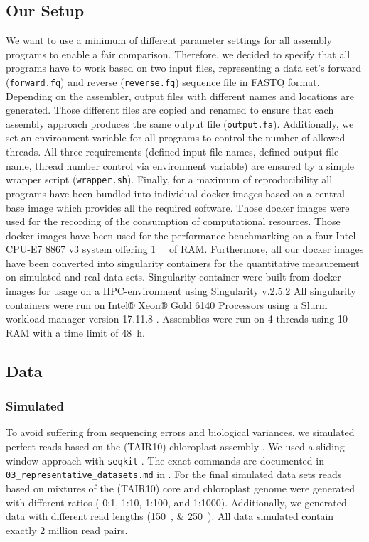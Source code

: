\documentclass{bmcart}
\newcommand{\zenododataset}{\cite{zenododataset}}
\begin{document}
\subsection*{Our Setup}
We want to use a minimum of different parameter settings for all assembly programs to enable a fair comparison. 
Therefore, we decided to specify that all programs have to work based on two input files, representing a data set's forward (\texttt{forward.fq}) and reverse  (\texttt{reverse.fq}) sequence file in FASTQ format.
Depending on the assembler, output files with different names and locations are generated.
Those different files are copied and renamed to ensure that each assembly approach produces the same output file (\texttt{output.fa}). 
Additionally, we set an environment variable for all programs to control the number of allowed threads.
All three requirements (defined input file names, defined output file name, thread number control via environment variable) are ensured by a simple wrapper script (\texttt{wrapper.sh}).
Finally, for a maximum of reproducibility all programs have been bundled into individual docker images based on a central base image which provides all the required software. Those docker images were used for the recording of the consumption of computational resources.
Those docker images have been used for the performance benchmarking on a four Intel CPU-E7 8867 v3 system offering \SI{1}{\tera\byte} of RAM.
Furthermore, all our docker images have been converted into singularity containers for the quantitative measurement on simulated and real data sets.
Singularity container were built from docker images for usage on a HPC-environment using Singularity v.2.5.2 \cite{kurtzer2017singularity}
All singularity containers were run on %
Intel® Xeon® Gold \num{6140} Processors using a Slurm workload manager version 17.11.8 \cite{Jette02slurm}. Assemblies were run on \num{4} threads using \SI{10}{\gibi\byte} RAM with a time limit of \SI{48}{\hour}.
\subsection*{Data}
\subsubsection*{Simulated}
To avoid suffering from sequencing errors and biological variances, we simulated perfect reads based on the  (TAIR10) chloroplast assembly \cite{tair10}.
We used a sliding window approach with \texttt{seqkit} \cite{seqkit}. The exact commands are documented in \href{https://github.com/chloroExtractorTeam/benchmark/blob/master/03_representative_datasets.md}{\texttt{03\_representative\_datasets.md}} in \zenododataset{}.
For the final simulated data sets reads based on mixtures of the  (TAIR10) core and chloroplast genome were generated with different ratios ( \num{0}:\num{1}, \num{1}:\num{10}, \num{1}:\num{100}, and \num{1}:\num{1000}).
Additionally, we generated data with different read lengths (\SIlist{150;250}{\basepair}). All data simulated contain exactly 2 million read pairs.
\end{document}
